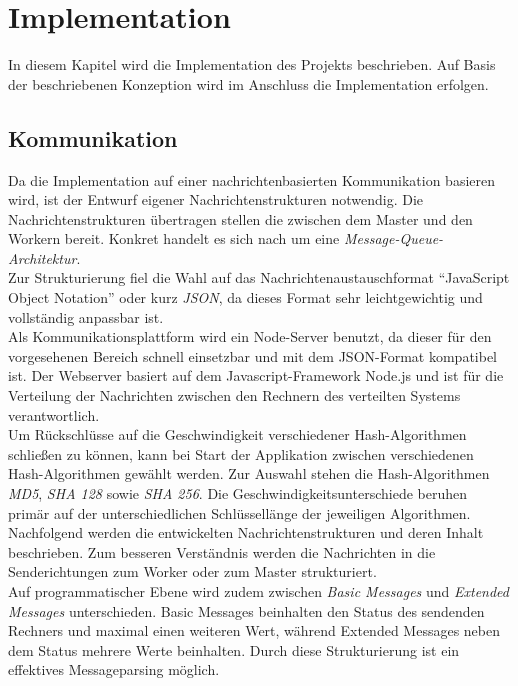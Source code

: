 \chapter{Implementation}
\label{implementation}
In diesem Kapitel wird die Implementation des Projekts beschrieben. Auf Basis der beschriebenen Konzeption wird im Anschluss die Implementation erfolgen. 
\section{Kommunikation}
Da die Implementation auf einer nachrichtenbasierten Kommunikation basieren wird, ist der Entwurf eigener Nachrichtenstrukturen notwendig. Die Nachrichtenstrukturen übertragen stellen die zwischen dem Master und den Workern bereit. Konkret handelt es sich nach \citep{tanenbaum} um eine \emph{Message-Queue-Architektur}. \\
Zur Strukturierung fiel die Wahl auf das Nachrichtenaustauschformat \enquote{JavaScript Object Notation} oder kurz \emph{JSON}, da dieses Format sehr leichtgewichtig und vollständig anpassbar ist. \\
Als Kommunikationsplattform wird ein Node-Server benutzt, da dieser für den vorgesehenen Bereich schnell einsetzbar und mit dem JSON-Format kompatibel ist. Der Webserver basiert auf dem Javascript-Framework Node.js und ist für die Verteilung der Nachrichten zwischen den Rechnern des verteilten Systems verantwortlich. \\

Um Rückschlüsse auf die Geschwindigkeit verschiedener Hash-Algorithmen schließen zu können, kann bei Start der Applikation zwischen verschiedenen Hash-Algorithmen gewählt werden. Zur Auswahl stehen die Hash-Algorithmen \emph{MD5}, \emph{SHA 128} sowie \emph{SHA 256}. Die Geschwindigkeitsunterschiede beruhen primär auf der unterschiedlichen Schlüssellänge der jeweiligen Algorithmen.\\


Nachfolgend werden die entwickelten Nachrichtenstrukturen und deren Inhalt beschrieben. Zum besseren Verständnis werden die Nachrichten in die Senderichtungen zum Worker oder zum Master strukturiert. \\
Auf programmatischer Ebene wird zudem zwischen \emph{Basic Messages} und \emph{Extended Messages} unterschieden. Basic Messages beinhalten den Status des sendenden Rechners und maximal einen weiteren Wert, während Extended Messages neben dem Status mehrere Werte beinhalten. Durch diese Strukturierung ist ein effektives Messageparsing möglich. 

